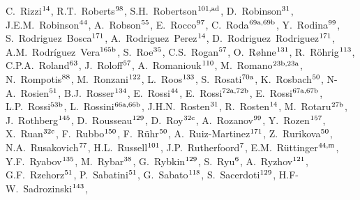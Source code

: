 \begin{flushleft}
C.~Rizzi$^\textrm{\scriptsize 14}$,    
R.T.~Roberts$^\textrm{\scriptsize 98}$,    
S.H.~Robertson$^\textrm{\scriptsize 101,ad}$,    
D.~Robinson$^\textrm{\scriptsize 31}$,    
J.E.M.~Robinson$^\textrm{\scriptsize 44}$,    
A.~Robson$^\textrm{\scriptsize 55}$,    
E.~Rocco$^\textrm{\scriptsize 97}$,    
C.~Roda$^\textrm{\scriptsize 69a,69b}$,    
Y.~Rodina$^\textrm{\scriptsize 99}$,    
S.~Rodriguez~Bosca$^\textrm{\scriptsize 171}$,    
A.~Rodriguez~Perez$^\textrm{\scriptsize 14}$,    
D.~Rodriguez~Rodriguez$^\textrm{\scriptsize 171}$,    
A.M.~Rodr\'iguez~Vera$^\textrm{\scriptsize 165b}$,    
S.~Roe$^\textrm{\scriptsize 35}$,    
C.S.~Rogan$^\textrm{\scriptsize 57}$,    
O.~R{\o}hne$^\textrm{\scriptsize 131}$,    
R.~R\"ohrig$^\textrm{\scriptsize 113}$,    
C.P.A.~Roland$^\textrm{\scriptsize 63}$,    
J.~Roloff$^\textrm{\scriptsize 57}$,    
A.~Romaniouk$^\textrm{\scriptsize 110}$,    
M.~Romano$^\textrm{\scriptsize 23b,23a}$,    
N.~Rompotis$^\textrm{\scriptsize 88}$,    
M.~Ronzani$^\textrm{\scriptsize 122}$,    
L.~Roos$^\textrm{\scriptsize 133}$,    
S.~Rosati$^\textrm{\scriptsize 70a}$,    
K.~Rosbach$^\textrm{\scriptsize 50}$,    
N-A.~Rosien$^\textrm{\scriptsize 51}$,    
B.J.~Rosser$^\textrm{\scriptsize 134}$,    
E.~Rossi$^\textrm{\scriptsize 44}$,    
E.~Rossi$^\textrm{\scriptsize 72a,72b}$,    
E.~Rossi$^\textrm{\scriptsize 67a,67b}$,    
L.P.~Rossi$^\textrm{\scriptsize 53b}$,    
L.~Rossini$^\textrm{\scriptsize 66a,66b}$,    
J.H.N.~Rosten$^\textrm{\scriptsize 31}$,    
R.~Rosten$^\textrm{\scriptsize 14}$,    
M.~Rotaru$^\textrm{\scriptsize 27b}$,    
J.~Rothberg$^\textrm{\scriptsize 145}$,    
D.~Rousseau$^\textrm{\scriptsize 129}$,    
D.~Roy$^\textrm{\scriptsize 32c}$,    
A.~Rozanov$^\textrm{\scriptsize 99}$,    
Y.~Rozen$^\textrm{\scriptsize 157}$,    
X.~Ruan$^\textrm{\scriptsize 32c}$,    
F.~Rubbo$^\textrm{\scriptsize 150}$,    
F.~R\"uhr$^\textrm{\scriptsize 50}$,    
A.~Ruiz-Martinez$^\textrm{\scriptsize 171}$,    
Z.~Rurikova$^\textrm{\scriptsize 50}$,    
N.A.~Rusakovich$^\textrm{\scriptsize 77}$,    
H.L.~Russell$^\textrm{\scriptsize 101}$,    
J.P.~Rutherfoord$^\textrm{\scriptsize 7}$,    
E.M.~R{\"u}ttinger$^\textrm{\scriptsize 44,m}$,    
Y.F.~Ryabov$^\textrm{\scriptsize 135}$,    
M.~Rybar$^\textrm{\scriptsize 38}$,    
G.~Rybkin$^\textrm{\scriptsize 129}$,    
S.~Ryu$^\textrm{\scriptsize 6}$,    
A.~Ryzhov$^\textrm{\scriptsize 121}$,    
G.F.~Rzehorz$^\textrm{\scriptsize 51}$,    
P.~Sabatini$^\textrm{\scriptsize 51}$,    
G.~Sabato$^\textrm{\scriptsize 118}$,    
S.~Sacerdoti$^\textrm{\scriptsize 129}$,    
H.F-W.~Sadrozinski$^\textrm{\scriptsize 143}$,    

\end{flushleft}

